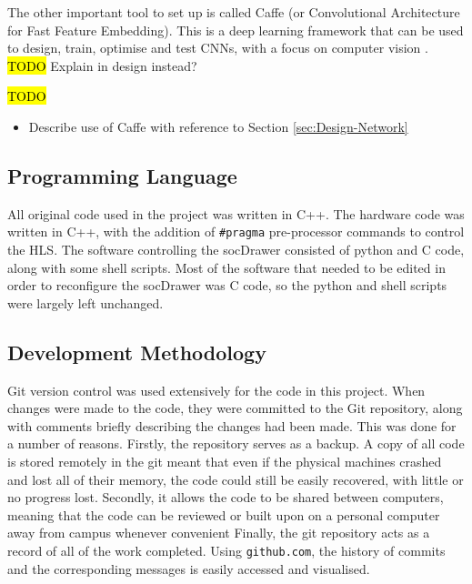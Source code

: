 \documentclass[12pt]{article}
\begin{document}
The other important tool to set up is called Caffe (or Convolutional Architecture for Fast Feature Embedding). This is a deep learning framework that can be used to design, train, optimise and test CNNs, with a focus on computer vision \cite{jia2014caffe}. \hl{TODO} Explain in design instead?



\hl{TODO}

\begin{itemize}
\item Describe use of Caffe with reference to Section \ref{sec:Design-Network}
\end{itemize}

\subsection{Programming Language}
\label{sec:Imp-Language}

All original code used in the project was written in C++. The hardware code was written in C++, with the addition of \lstinline|#pragma| pre-processor commands to control the HLS. The software controlling the socDrawer consisted of python and C code, along with some shell scripts. Most of the software that needed to be edited in order to reconfigure the socDrawer was C code, so the python and shell scripts were largely left unchanged.

\subsection{Development Methodology}
\label{sec:Imp-Devlopment}

Git version control was used extensively for the code in this project. When changes were made to the code, they were committed to the Git repository, along with comments briefly describing the changes had been made. This was done for a number of reasons. Firstly, the repository serves as a backup. A copy of all code is stored remotely in the git meant that even if the physical machines crashed and lost all of their memory, the code could still be easily recovered, with little or no progress lost. Secondly, it allows the code to be shared between computers, meaning that the code can be reviewed or built upon on a personal computer away from campus whenever convenient Finally, the git repository acts as a record of all of the work completed. Using \lstinline|github.com|, the history of commits and the corresponding messages is easily accessed and visualised. 
\end{document}
